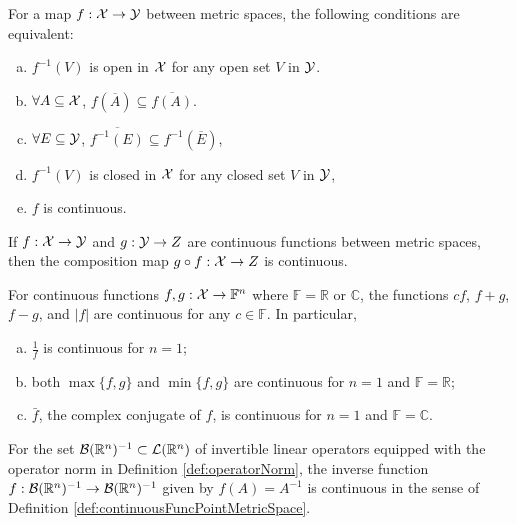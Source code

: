 \begin{thm}
  \label{thm:contMapConditions}
  For a map $f:{\cal X}\rightarrow {\cal Y}$ between metric spaces,
  the following conditions are equivalent:
  \begin{enumerate}[(a)]\itemsep0em
  \item $f^{-1}(V)$ is open in ${\cal X}$ for any open set $V$ in ${\cal Y}$.
  \item $\forall A\subseteq {\cal X}$,
    $f(\overline{A})\subseteq \overline{f(A)}$.
  \item $\forall E\subseteq {\cal Y}$,
    $\overline{f^{-1}(E)}\subseteq f^{-1}(\overline{E})$, 
  \item $f^{-1}(V)$ is closed in ${\cal X}$
    for any closed set $V$ in ${\cal Y}$,
  \item $f$ is continuous. 
  \end{enumerate}
\end{thm}

\begin{lem}
  \label{lem:compositionMapIsContinuous}
  If $f:{\cal X}\rightarrow {\cal Y}$ and $g:{\cal Y}\rightarrow Z$
  are continuous functions between metric spaces,
  then the composition map $g\circ f: {\cal X}\rightarrow Z$
  is continuous.
\end{lem}

\begin{lem}
  \label{lem:elementaryMapIsContinuousNF}
  For continuous functions $f,g:{\cal X}\rightarrow\mathbb{F}^n$ 
  where $\mathbb{F}=\mathbb{R}$ or $\mathbb{C}$, 
  the functions $cf$, $f+g$, $f-g$, and $|f|$
  are continuous for any $c\in\mathbb{F}$.
  In particular, 
  \begin{enumerate}[(a)]\itemsep0em
  \item $\frac{1}{f}$ is continuous for $n=1$;
  \item both $\max\{f,g\}$ and $\min\{f,g\}$
    are continuous for $n=1$ and $\mathbb{F}=\mathbb{R}$;
  \item $\bar{f}$, the complex conjugate of $f$, is continuous
    for $n=1$ and $\mathbb{F}=\mathbb{C}$. 
  \end{enumerate}
\end{lem}

\begin{lem}
  \label{lem:funcInverseIsContinuous}
  For the set ${\cal B}(\mathbb{R}^n)^{-1}\subset
  {\cal L}(\mathbb{R}^n)$
  of invertible linear operators equipped
  with the operator norm in Definition \ref{def:operatorNorm},
  the inverse function 
  $f: {\cal B}(\mathbb{R}^n)^{-1}\rightarrow
  {\cal B}(\mathbb{R}^n)^{-1}$ 
  given by $f(A) = A^{-1}$ is continuous
  in the sense of Definition \ref{def:continuousFuncPointMetricSpace}.
\end{lem}

